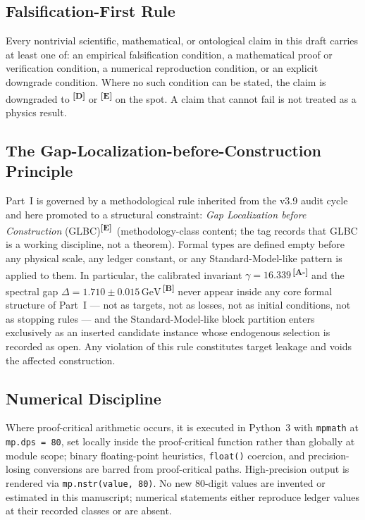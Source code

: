 \documentclass[12pt,a4paper,twoside]{article}
\theoremstyle{plain}
\theoremstyle{definition}
\theoremstyle{remark}
\newcommand{\GeV}{\,\mathrm{GeV}}
\newcommand{\catmark}[1]{\textsuperscript{\textsf{\textbf{[#1]}}}}
\newcommand{\DeltaGap}{1.710 \pm 0.015\GeV} %
\newcommand{\GammaGeom}{16.339} %
\begin{document}
\subsection{Falsification-First Rule}
\label{subsec:falsification-first}

Every nontrivial scientific, mathematical, or ontological claim in this
draft carries at least one of: an empirical falsification condition, a
mathematical proof or verification condition, a numerical reproduction
condition, or an explicit downgrade condition. Where no such condition can
be stated, the claim is downgraded to \catmark{D} or \catmark{E} on the
spot. A claim that cannot fail is not treated as a physics result.

\subsection{The Gap-Localization-before-Construction Principle}
\label{subsec:glbc}

Part~I is governed by a methodological rule inherited from the v3.9 audit
cycle and here promoted to a structural constraint: \emph{Gap Localization
before Construction} (GLBC)\catmark{E}\ (methodology-class content; the
tag records that GLBC is a working discipline, not a theorem). Formal
types are defined empty before any physical scale, any ledger constant, or
any Standard-Model-like pattern is applied to them. In particular, the
calibrated invariant $\gamma = \GammaGeom$\,\catmark{A-} and the spectral
gap $\Delta = \DeltaGap$\,\catmark{B} never appear inside any core formal
structure of Part~I --- not as targets, not as losses, not as initial
conditions, not as stopping rules --- and the Standard-Model-like block
partition enters exclusively as an inserted candidate instance whose
endogenous selection is recorded as open. Any violation of this rule
constitutes target leakage and voids the affected construction.

\subsection{Numerical Discipline}
\label{subsec:numerical-discipline}

Where proof-critical arithmetic occurs, it is executed in Python~3 with
\texttt{mpmath} at \texttt{mp.dps = 80}, set locally inside the
proof-critical function rather than globally at module scope; binary
floating-point heuristics, \texttt{float()} coercion, and precision-losing
conversions are barred from proof-critical paths. High-precision output is
rendered via \texttt{mp.nstr(value, 80)}. No new 80-digit values are
invented or estimated in this manuscript; numerical statements either reproduce
ledger values at their recorded classes or are absent.
\end{document}
